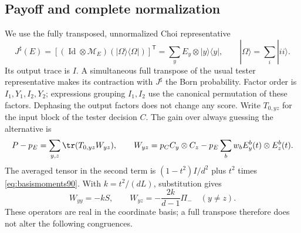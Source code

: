 \subsection{Payoff and complete normalization}
We use the fully transposed, unnormalized Choi representative
\begin{equation}\label{eq:choiconvention90}
 J^\sharp(E)=\left[(\operatorname{Id}\otimes\mathcal M_E)
          (|\Omega\rangle\langle\Omega|)\right]^{\mathsf T}
       =\sum_y E_y\otimes|y\rangle\langle y|,
 \qquad |\Omega\rangle=\sum_i|ii\rangle.
\end{equation}
Its output trace is $I$.  A simultaneous full transpose of the usual
tester representative makes its contraction with $J^\sharp$ the Born
probability.  Factor order is $I_1,Y_1,I_2,Y_2$; expressions grouping
$I_1,I_2$ use the canonical permutation of these factors.
Dephasing the output factors does not change any score.  Write $T_{0,yz}$
for the input block of the tester decision $C$.  The gain over always
guessing the alternative is
\begin{equation}\label{eq:payoff90}
 P-p_E=\sum_{y,z}\tr(T_{0,yz}W_{yz}),\qquad
 W_{yz}=p_C C_y\otimes C_z-p_E\sum_b w_b E_y^b(t)\otimes E_z^b(t).
\end{equation}
The averaged tensor in the second term is $(1-t^2)I/d^2$ plus $t^2$
times \eqref{eq:basismoments90}.  With $k=t^2/(dL)$, substitution gives
\begin{equation}\label{eq:payoffblocks90}
 W_{yy}=-kS,\qquad W_{yz}=-\frac{2k}{d-1}\Pi_-\quad(y\ne z).
\end{equation}
These operators are real in the coordinate basis; a full transpose
therefore does not alter the following congruences.

